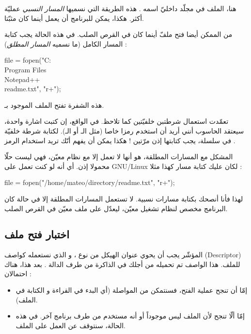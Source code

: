 هنا، الملف
في مجلّد  داخليّ اسمه
.
هذه الطريقة التي نسميها
\textit{المسار النسبي}
عمليّة أكثر. هكذا، يمكن للبرنامج أن يعمل أينما كان مثبّتا.

من الممكن أيضا فتح ملفّ أينما كان في القرص الصلب. في هذه الحالة يجب كتابة المسار الكامل (ما نسميه
\textit{المسار المطلق}) :

\begin{Csource}
  file = fopen("C:\\Program Files\\Notepad++\\readme.txt", "r+");
\end{Csource}

هذه الشفرة تفتح الملف
الموجود بـ.

\begin{warning}
  تعمّدت استعمال شرطتبن خلفيّتين
\InlineCode{\textbackslash}
  كما تلاحظ. في الواقع، إن كتبت اشارة واحدة، سيعتقد الحاسوب أنني أريد أن استخدم رمزا خاصا (مثل الـ
أو الـ).
لكتابة شرطة خلفيّة في سلسلة، يجب كتابتها إذن مرّتين ! هكذا يمكن أن يفهم أنّك تريد استخدام الرمز
\InlineCode{\textbackslash}.
\end{warning}

المشكل مع المسارات المطلقة، هو أنها لا تعمل إلا مع نظام معيّن، فهي ليست حلّا محمولا إذن. أي أنه لو كنت تعمل على
\textenglish{GNU/Linux}
لكان عليك كتابة مسار كهذا مثلا :

\begin{Csource}
  file = fopen("/home/mateo/directory/readme.txt", "r+");
\end{Csource}

لهذا فأنا أنصحك بكتابة مسارات نسبية. لا تستعمل المسارات المطلقة إلا في حالة كان البرنامج مخصص لنظام تشغيل معيّن، ليعدّل على ملف معيّن في القرص الصلب.

\subsection{اختبار فتح ملف}
المؤشّر
يجب أن يحوي عنوان الهيكل من نوع
،
و الذي نستعمله كواصف
(\textenglish{Descriptor})
للملف. هذا الواصف تم تحميله من أجلك في الذاكرة من طرف الدالة
.
بعد هذا، هناك احتمالان :

\begin{itemize}
  \item إمّا أن تنجح عملية الفتح، فسنتمكن من المواصلة (أي البدء في القراءة و الكتابة في الملف).
  \item إمّا ألّا تنجح لأن الملف ليس موجوداً أو أنه مستخدم من طرف برنامج آخر. في هذه الحالة، سنتوقف عن العمل على الملف.
\end{itemize}

